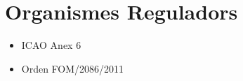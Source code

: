 
\section{Organismes Reguladors}

\begin{itemize}
\item ICAO Anex 6
\item Orden FOM/2086/2011
\end{itemize}